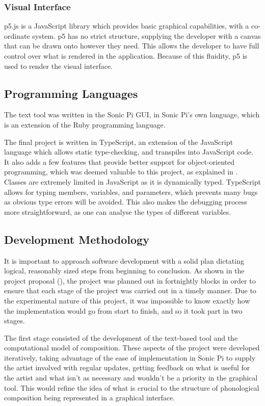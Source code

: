\documentclass[12pt,a4paper,oneside,openright]{report}
\begin{document}
\subsubsection{Visual Interface}
p5.js is a JavaScript library which provides basic graphical capabilities, with a co-ordinate system. p5 has no strict structure, supplying the developer with a canvas that can be drawn onto however they need. This allows the developer to have full control over what is rendered in the application. Because of this fluidity, p5 is used to render the visual interface.

\subsection{Programming Languages}
The text tool was written in the Sonic Pi GUI, in Sonic Pi's own language, which is an extension of the Ruby programming language.

The final project is written in TypeScript, an extension of the JavaScript language which allows static type-checking, and transpiles into JavaScript code. It also adds a few features that provide better support for object-oriented programming, which was deemed valuable to this project, as explained in . Classes are extremely limited in JavaScript as it is dynamically typed. TypeScript allows for typing members, variables, and parameters, which prevents many bugs as obvious type errors will be avoided. This also makes the debugging process more straightforward, as one can analyse the types of different variables.

\subsection{Development Methodology}
It is important to approach software development with a solid plan dictating logical, reasonably sized steps from beginning to conclusion. As shown in the project proposal (), the project was planned out in fortnightly blocks in order to ensure that each stage of the project was carried out in a timely manner. Due to the experimental nature of this project, it was impossible to know exactly how the implementation would go from start to finish, and so it took part in two stages. 

The first stage consisted of the development of the text-based tool and the computational model of composition. These aspects of the project were developed iteratively, taking advantage of the ease of implementation in Sonic Pi to supply the artist involved with regular updates, getting feedback on what is useful for the artist and what isn't as necessary and wouldn't be a priority in the graphical tool. This would refine the idea of what is crucial to the structure of phonological composition being represented in a graphical interface.
\end{document}
